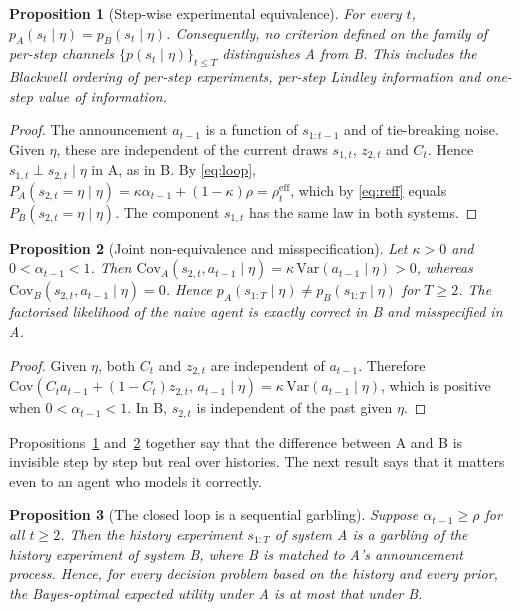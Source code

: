 \documentclass[11pt]{article}
\newtheorem{proposition}{Proposition}
\theoremstyle{definition}
\theoremstyle{remark}
\newcommand{\reff}{\rho^{\mathrm{eff}}}
\begin{document}
\begin{proposition}[Step-wise experimental equivalence]\label{prop:equiv}
For every $t$, $p_A(s_t\mid\eta)=p_B(s_t\mid\eta)$. Consequently, no criterion
defined on the family of per-step channels $\{p(s_t\mid\eta)\}_{t\le T}$
distinguishes A from B. This includes the Blackwell ordering of per-step
experiments, per-step Lindley information and one-step value of information.
\end{proposition}

\begin{proof}
The announcement $a_{t-1}$ is a function of $s_{1:t-1}$ and of tie-breaking
noise. Given $\eta$, these are independent of the current draws $s_{1,t}$,
$z_{2,t}$ and $C_t$. Hence $s_{1,t}\perp s_{2,t}\mid\eta$ in A, as in B. By
\eqref{eq:loop},
$P_A(s_{2,t}=\eta\mid\eta)=\kappa\alpha_{t-1}+(1-\kappa)\rho=\reff_t$, which by
\eqref{eq:reff} equals $P_B(s_{2,t}=\eta\mid\eta)$. The component $s_{1,t}$ has
the same law in both systems.
\end{proof}

\begin{proposition}[Joint non-equivalence and misspecification]\label{prop:joint}
Let $\kappa>0$ and $0<\alpha_{t-1}<1$. Then
$\mathrm{Cov}_A(s_{2,t},a_{t-1}\mid\eta)=\kappa\,\mathrm{Var}(a_{t-1}\mid\eta)>0$,
whereas $\mathrm{Cov}_B(s_{2,t},a_{t-1}\mid\eta)=0$. Hence
$p_A(s_{1:T}\mid\eta)\neq p_B(s_{1:T}\mid\eta)$ for $T\ge2$. The factorised
likelihood of the naive agent is exactly correct in B and misspecified in A.
\end{proposition}

\begin{proof}
Given $\eta$, both $C_t$ and $z_{2,t}$ are independent of $a_{t-1}$. Therefore
$\mathrm{Cov}(C_ta_{t-1}+(1-C_t)z_{2,t},\,a_{t-1}\mid\eta)=
\kappa\,\mathrm{Var}(a_{t-1}\mid\eta)$, which is positive when
$0<\alpha_{t-1}<1$. In B, $s_{2,t}$ is independent of the past given $\eta$.
\end{proof}

Propositions~\ref{prop:equiv} and~\ref{prop:joint} together say that the
difference between A and B is invisible step by step but real over histories.
The next result says that it matters even to an agent who models it correctly.

\begin{proposition}[The closed loop is a sequential garbling]\label{prop:garbling}
Suppose $\alpha_{t-1}\ge\rho$ for all $t\ge2$. Then the history experiment
$s_{1:T}$ of system A is a garbling of the history experiment of system B, where
B is matched to A's announcement process. Hence, for every decision problem
based on the history and every prior, the Bayes-optimal expected utility under A
is at most that under B.
\end{proposition}
\end{document}
